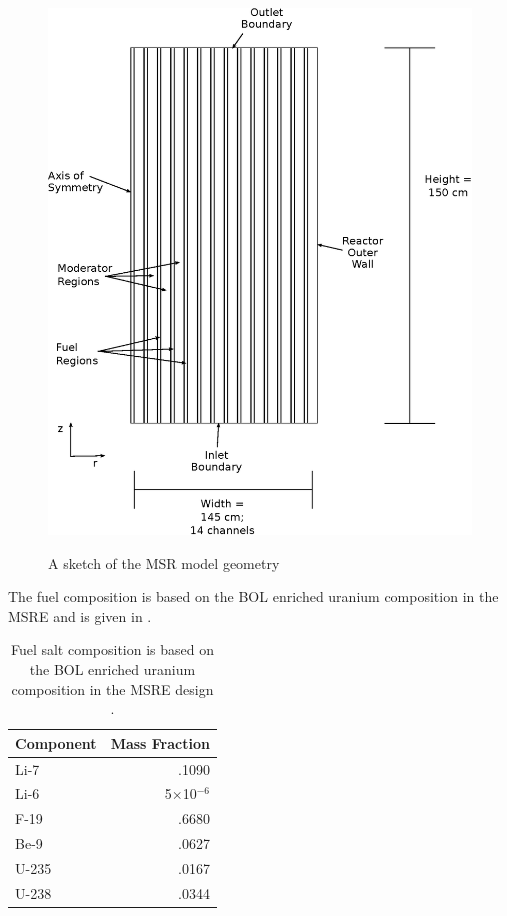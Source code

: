 \documentclass{article}
\begin{document}
\begin{figure}[htpb]
  \centering
  \includegraphics{geometry.eps}
  \label{fig:geom}
  \caption{A sketch of the \gls{MSR} model geometry}
\end{figure}


The fuel composition is based on the \gls{BOL} enriched uranium composition in the \gls{MSRE}
and is given in  \cite{robertson_msre_1965}.


\begin{table}[htpb]
  \begin{center}
    \begin{tabular}{l | r}
      Component & Mass Fraction\\\hline\hline
      Li-7 & .1090\\
      Li-6 & 5$\times$10$^{-6}$\\
      F-19 & .6680\\
      Be-9 & .0627\\
      U-235 & .0167\\
      U-238 & .0344\\
    \end{tabular}
  \end{center}
        \caption{Fuel salt composition is based on the \gls{BOL} enriched
        uranium composition in the \gls{MSRE} design
        \cite{robertson_msre_1965}.}
  \label{table:comp}
\end{table}
\end{document}
